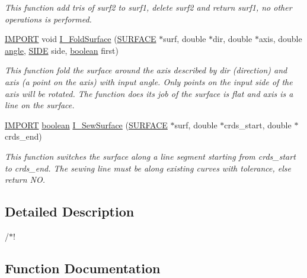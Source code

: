\begin{DoxyCompactItemize}
\begin{DoxyCompactList}\small\item\em This function add tris of surf2 to surf1, delete surf2 and return surf1, no other operations is performed. \end{DoxyCompactList}\item 
\hyperlink{cdecs_8h_a773175d74e73776d69c3e538f17de1ee}{I\+M\+P\+O\+RT} void \hyperlink{group___s_u_r_f_a_c_e_gaa81b70b707d4e749bee586d509ca5859}{I\+\_\+\+Fold\+Surface} (\hyperlink{int_8h_a1520d8870b5eafd76bd401aecb121ffd}{S\+U\+R\+F\+A\+CE} $\ast$surf, double $\ast$dir, double $\ast$axis, double \hyperlink{geomutils_8c_a3b0540d922a851790bae4f7b442cb60b}{angle}, \hyperlink{geom_8h_afd566e7928ff7b31ca7bcff47aae57b3}{S\+I\+DE} side, \hyperlink{cdecs_8h_ad048433382a936258fb49e2ec4f148e1}{boolean} first)
\begin{DoxyCompactList}\small\item\em This function fold the surface around the axis described by dir (direction) and axis (a point on the axis) with input angle. Only points on the input side of the axis will be rotated. The function does its job of the surface is flat and axis is a line on the surface. \end{DoxyCompactList}\item 
\hyperlink{cdecs_8h_a773175d74e73776d69c3e538f17de1ee}{I\+M\+P\+O\+RT} \hyperlink{cdecs_8h_ad048433382a936258fb49e2ec4f148e1}{boolean} \hyperlink{group___s_u_r_f_a_c_e_gaa967e7cfef31d8336ccfb657b0d255fa}{I\+\_\+\+Sew\+Surface} (\hyperlink{int_8h_a1520d8870b5eafd76bd401aecb121ffd}{S\+U\+R\+F\+A\+CE} $\ast$surf, double $\ast$crds\+\_\+start, double $\ast$crds\+\_\+end)
\begin{DoxyCompactList}\small\item\em This function switches the surface along a line segment starting from crds\+\_\+start to crds\+\_\+end. The sewing line must be along existing curves with tolerance, else return NO. \end{DoxyCompactList}\end{DoxyCompactItemize}


\subsection{Detailed Description}
/$\ast$! 

\subsection{Function Documentation}
